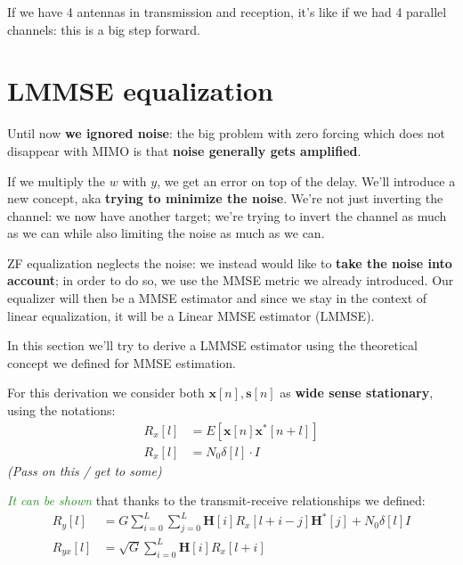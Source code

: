 \documentclass[a4paper, 12pt]{book}
\begin{document}
If we have 4 antennas in transmission and reception, it's like if we had 4 parallel channels: this is a big step forward.

\section{LMMSE equalization}

\begin{center}
\end{center}

Until now \textbf{we ignored noise}: the big problem with zero forcing which does not disappear with MIMO is that \textbf{noise generally gets amplified}.

If we multiply the $w$ with $y$, we get an error on top of the delay. We'll introduce a new concept, aka \textbf{trying to minimize the noise}. We're not just inverting the channel: we now have another target; we're trying to invert the channel as much as we can while also limiting the noise as much as we can.

ZF equalization neglects the noise: we instead would like to \textbf{take the noise into account}; in order to do so, we use the MMSE metric we already introduced. Our equalizer will then be a MMSE estimator and since we stay in the context of linear equalization, it will be a Linear MMSE estimator (LMMSE).

In this section we'll try to derive a LMMSE estimator using the theoretical concept we defined for MMSE estimation.

For this derivation we consider both $\mathbf{x}[n], \mathbf{s}[n]$ as \textbf{wide sense stationary}, using the notations:
\begin{align}
    R_x[l] &= E[\mathbf{x}[n]\mathbf{x}^*[n+l]] \\
    R_x[l] &= N_0 \delta[l] \cdot I
\end{align}
\textit{\footnotesize (Pass on this / get to some)}

\textit{\textcolor{ForestGreen}{It can be shown}} that thanks to the transmit-receive relationships we defined:
\begin{align}
    R_y[l] &= G \sum_{i=0}^{L} \sum_{j=0}^{L} \mathbf{H}[i] R_x[l+i-j] \mathbf{H}^*[j] + N_0 \delta[l] I \label{eq:2.154} \\
    R_{yx}[l] &= \sqrt{G} \sum_{i=0}^{L} \mathbf{H}[i] R_x[l+i] \label{eq:2.158}
\end{align}
\end{document}
